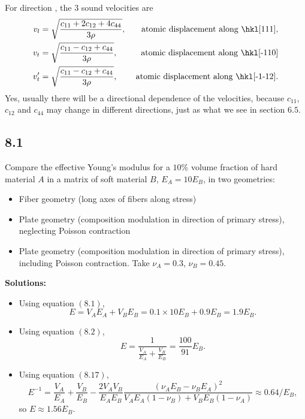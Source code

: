 \documentclass[12pt]{article}
\begin{document}
For direction \hkl[111], the $3$ sound velocities are
\begin{align}
  v_l  & = \sqrt{\frac{ c_{11} + 2 c_{12} + 4 c_{44} }{ 3 \rho }}, & \text{atomic displacement along \hkl[111]},    \\
  v_t  & = \sqrt{\frac{ c_{11} - c_{12} + c_{44} }{ 3 \rho }},     & \text{ atomic displacement along \hkl[-110]}   \\
  v_t' & = \sqrt{\frac{ c_{11} - c_{12} + c_{44} }{ 3 \rho }},     & \text{ atomic displacement along \hkl[-1-12]}.
\end{align}
Yes, usually there will be a directional dependence of the velocities,
because $c_{11}$, $c_{12}$ and $c_{44}$ may change in different directions, just as what we see in section $6.5$.

\subsection{8.1}
Compare the effective Young's modulus for a $10\%$ volume fraction of hard material $A$ in a matrix of soft material $B$, $E_A=10 E_B$, in two geometries:
\begin{itemize}
  \item Fiber geometry (long axes of fibers along stress)
  \item Plate geometry (composition modulation in direction of primary stress), neglecting Poisson contraction
  \item Plate geometry (composition modulation in direction of primary stress), including Poisson contraction. Take $\nu_A= 0.3$, $\nu_B= 0.45$.
\end{itemize}

\textbf{Solutions:}
\begin{itemize}
  \item Using equation $(8.1)$,
        \begin{equation}
          E = V_A E_A + V_B E_B = 0.1 \times 10 E_B + 0.9 E_B = 1.9 E_B.
        \end{equation}

  \item Using equation $(8.2)$,
        \begin{equation}
          E = \frac{ 1 }{ \frac{ V_A }{ E_A } + \frac{ V_B }{ E_B } }
          = \frac{ 100 }{ 91 } E_B.
        \end{equation}

  \item Using equation $(8.17)$,
        \begin{equation}
          E^{-1} = \frac{V_A}{E_A}+\frac{V_B}{E_B}- \frac{2 V_A V_B}{E_A E_B}\frac{\left(\nu_A E_B-\nu_B E_A\right)^2}{V_A E_A\left(1- \nu_B\right)+ V_B E_B\left(1 - \nu_A\right)}
          \approx 0.64 / E_B,
        \end{equation}
        so $E \approx 1.56 E_B$.
\end{itemize}
\end{document}
